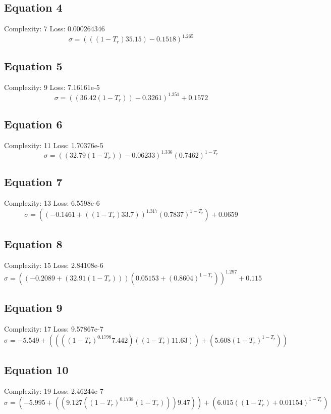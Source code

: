 \documentclass[11pt]{article}
\begin{document}
\subsection*{Equation 4}
\noindent Complexity: 7 \quad Loss: 0.000264346 \\[4pt]
\[
\sigma = \left(((1 - T_r) 35.15) - 0.1518\right)^{1.265}
\]

\subsection*{Equation 5}
\noindent Complexity: 9 \quad Loss: 7.16161e-5 \\[4pt]
\[
\sigma = \left((36.42 (1 - T_r)) - 0.3261\right)^{1.251} + 0.1572
\]

\subsection*{Equation 6}
\noindent Complexity: 11 \quad Loss: 1.70376e-5 \\[4pt]
\[
\sigma = \left((32.79 (1 - T_r)) - 0.06233\right)^{1.336} \left(0.7462\right)^{1 - T_r}
\]

\subsection*{Equation 7}
\noindent Complexity: 13 \quad Loss: 6.5598e-6 \\[4pt]
\[
\sigma = (\left(-0.1461 + ((1 - T_r) 33.7)\right)^{1.317} \left(0.7837\right)^{1 - T_r}) + 0.0659
\]

\subsection*{Equation 8}
\noindent Complexity: 15 \quad Loss: 2.84108e-6 \\[4pt]
\[
\sigma = \left((-0.2089 + (32.91 (1 - T_r))) (0.05153 + \left(0.8604\right)^{1 - T_r})\right)^{1.297} + 0.115
\]

\subsection*{Equation 9}
\noindent Complexity: 17 \quad Loss: 9.57867e-7 \\[4pt]
\[
\sigma = -5.549 + (((\left(1 - T_r\right)^{0.1798} 7.442) ((1 - T_r) 11.63)) + (5.608 \left(1 - T_r\right)^{1 - T_r}))
\]

\subsection*{Equation 10}
\noindent Complexity: 19 \quad Loss: 2.46244e-7 \\[4pt]
\[
\sigma = (-5.995 + ((9.127 (\left(1 - T_r\right)^{0.1738} (1 - T_r))) 9.47)) + (6.015 \left((1 - T_r) + 0.01154\right)^{1 - T_r})
\]
\end{document}
